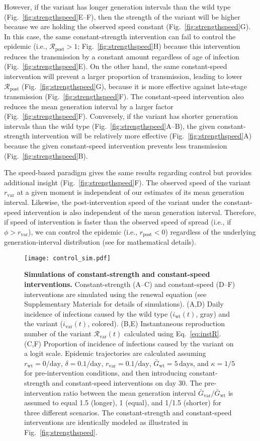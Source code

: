 \documentclass[12pt]{article}
\newcommand{\eref}[1]{Eq.~\ref{eq:#1}}
\newcommand{\fref}[1]{Fig.~\ref{fig:#1}}
\newcommand{\vvvar}{\mathrm{var}}
\newcommand{\wwwt}{\mathrm{wt}}
\newcommand{\rx}[1]{\ensuremath{{r}_{#1}}\xspace}
\newcommand{\ry}[1]{\rx{\mathrm{#1}}}
\newcommand{\rw}{\rx{\wwwt}}
\newcommand{\rv}{\rx{\vvvar}}
\newcommand{\Rx}[1]{\ensuremath{{\mathcal R}_{#1}}\xspace}
\newcommand{\Ry}[1]{\Rx{\mathrm{#1}}}
\newcommand{\Rv}{\Rx{\vvvar}}
\newcommand{\pday}{\ensuremath{/\textrm{day}}}
\newcommand{\ix}[1]{\ensuremath{{i}_{#1}}\xspace}
\newcommand{\iw}{\ix{\wwwt}}
\newcommand{\iv}{\ix{\vvvar}}
\newcommand{\Gx}[1]{\ensuremath{{\bar G}_{#1}}\xspace}
\newcommand{\Gy}[1]{\Gx{\mathrm{#1}}}
\begin{document}
However, if the variant has longer generation intervals than the wild type (\fref{strengthspeed}E--F), then the strength of the variant will be higher because we are holding the observed speed constant (\fref{strengthspeed}G).
In this case, the same constant-strength intervention can fail to control the epidemic (i.e., $\Ry{post} > 1$; \fref{strengthspeed}H) because this intervention reduces the transmission by a constant amount regardless of age of infection (\fref{strengthspeed}E).
On the other hand, the same constant-speed intervention will prevent a larger proportion of transmission, leading to lower $\Ry{post}$ (\fref{strengthspeed}G), because it is more effective against late-stage transmission (\fref{strengthspeed}F).
The constant-speed intervention also reduces the mean generation interval by a larger factor (\fref{strengthspeed}F).
Conversely, if the variant has shorter generation intervals than the wild type (\fref{strengthspeed}A--B), the given constant-strength intervention will be relatively more effective (\fref{strengthspeed}A) because the given constant-speed intervention prevents less transmission (\fref{strengthspeed}B).

The speed-based paradigm gives the same results regarding control but provides additional insight (\fref{strengthspeed}F).
The observed speed of the variant $\rv$ at a given moment is independent of our estimates of its mean generation interval.
Likewise, the post-intervention speed of the variant under the constant-speed intervention is also independent of the mean generation interval.
Therefore, if speed of intervention is faster than the observed speed of spread (i.e., if $\phi > \rv$), we can control the epidemic (i.e., $\ry{post} < 0$) regardless of the underlying generation-interval distribution (see \cite{doi:10.1098/rspb.2020.1556} for mathematical details).

\begin{figure}[!th]
\begin{center}
\texttt{[image: control\_sim.pdf]}
\caption{
\textbf{Simulations of constant-strength and constant-speed interventions.}
Constant-strength (A--C) and constant-speed (D--F) interventions are simulated using the renewal equation (see Supplementary Materials for details of simulations).
(A,D) Daily incidence of infections caused by the wild type ($\iw(t)$, gray) and the variant ($\iv(t)$, colored).
(B,E) Instantaneous reproduction number of the variant $\Rv(t)$ calculated using \eref{instR}.
(C,F) Proportion of incidence of infections caused by the variant on a logit scale. 
Epidemic trajectories are calculated assuming $\rw=0\pday$, $\delta=0.1\pday$, $\rv=0.1\pday$, $\Gy{wt}=5\,\textrm{days}$, and $\kappa=1/5$ for pre-intervention conditions, and then introducing constant-strength and constant-speed interventions on day 30.
The pre-intervention ratio between the mean generation interval $\Gy{var}/\Gy{wt}$ is assumed to equal 1.5 (longer), 1 (equal), and 1/1.5 (shorter) for three different scenarios.
The constant-strength and constant-speed interventions are identically modeled as illustrated in \fref{strengthspeed}.
}
\label{fig:control_sim}
\end{center}
\end{figure}
\end{document}

